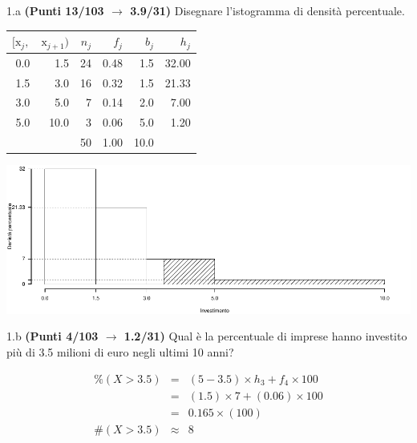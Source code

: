\documentclass[
  11pt,
]{book}
\theoremstyle{mytheoremstyle}
\theoremstyle{mydefstyle}
\newenvironment{sol}
  {
  \begin{tcolorbox}[enhanced,breakable,arc=0.1mm,boxrule=1pt,colback=white,colframe=iblue,
  title=\bf \fontfamily{lmss}\selectfont \hspace{.5 cm} Soluzione,drop fuzzy shadow]

}{
\end{tcolorbox}
  }
\begin{document}
1.a \textbf{(Punti 13/103 \(\rightarrow\) 3.9/31)} Disegnare l'istogramma di densità percentuale.

\begin{sol}

\begin{table}[H]
\centering
\begin{tabular}{rrrrrr}
\toprule
$[\text{x}_j,$ & $\text{x}_{j+1})$ & $n_j$ & $f_j$ & $b_j$ & $h_j$\\
\midrule
0.0 & 1.5 & 24 & 0.48 & 1.5 & 32.00\\
1.5 & 3.0 & 16 & 0.32 & 1.5 & 21.33\\
3.0 & 5.0 & 7 & 0.14 & 2.0 & 7.00\\
5.0 & 10.0 & 3 & 0.06 & 5.0 & 1.20\\
 &  & 50 & 1.00 & 10.0 & \\
\bottomrule
\end{tabular}
\end{table}

\begin{center}\includegraphics{Esami_passati_con_soluzioni_files/figure-latex/1.1b-1} \end{center}

\end{sol}

1.b \textbf{(Punti 4/103 \(\rightarrow\) 1.2/31)} Qual è la percentuale di imprese hanno investito più di 3.5 milioni di euro negli ultimi 10 anni?

\begin{sol}
\begin{eqnarray*}
     \%(X> 3.5 ) &=& ( 5 - 3.5 )\times h_{ 3 }+ f_{ 4 }\times 100 \\
              &=& ( 1.5 )\times 7 + ( 0.06 )\times 100 \\
              &=&  0.165 \times(100)\\
     \#(X> 3.5 ) &\approx& 8 
         \end{eqnarray*}

\end{sol}
\end{document}

